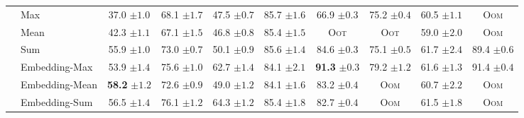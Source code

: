 \begin{table}
{\begin{tabular}{@{}c <{\enspace}@{}lcccccccc@{}}
			\multirow{6}{*}{\rotatebox{90}{$\wlnn$}} 	&
			\textsf{Max}       &  37.0 \scriptsize	$\pm 1.0$ &   68.1  \scriptsize $\pm 1.7$ & 47.5 \scriptsize $\pm 0.7$ &  85.7 \scriptsize $\pm 1.6$ &  66.9 \scriptsize $\pm 0.3$ &    75.2 \scriptsize $\pm 0.4$ & 60.5  \scriptsize $\pm 1.1$ &\textsc{Oom} 
			\\ 
			                                                         & \textsf{Mean}               & 42.3   \scriptsize	$\pm 1.1$        & 67.1    \scriptsize $\pm 1.5$           & 46.8  \scriptsize $\pm 0.8$           & 85.4  \scriptsize $\pm 1.5$          & \textsc{Oot}                        & \textsc{Oot}                         & 59.0 \scriptsize $\pm 2.0$          & \textsc{Oom}          
			\\ 	
			                                                         & \textsf{Sum}     & 55.9  \scriptsize	$\pm 1.0$         & 73.0     \scriptsize $\pm 0.7$          & 50.1 \scriptsize $\pm 0.9$            & 85.6  \scriptsize $\pm 1.4$          & 84.6  \scriptsize $\pm 0.3$         & 75.1 \scriptsize $\pm 0.5$           & 61.7 \scriptsize $\pm 2.4 $         & 89.4  \scriptsize $\pm 0.6$         
			\\  
			\cmidrule{2-10}  		
			                                                         & \textsf{Embedding-Max} & 53.9  \scriptsize	$\pm 1.4$         & 75.6  \scriptsize $\pm 1.0$             & 62.7 \scriptsize $\pm 1.4$            & 84.1  \scriptsize $\pm 2.1$          & \textbf{91.3} \scriptsize $\pm 0.3$ & 79.2 \scriptsize $\pm 1.2$           & 61.6  \scriptsize $\pm 1.3$         & 91.4 \scriptsize $\pm 0.4$          
			\\ 
			                                                         & \textsf{Embedding-Mean}     & \textbf{58.2} \scriptsize	$\pm 1.2$ & 72.6     \scriptsize $\pm 0.9 $         & 49.0 \scriptsize $\pm 1.2$            & 84.1   \scriptsize $\pm 1.6$         & 83.2  \scriptsize $\pm 0.4$         & \textsc{Oom}                         & 60.7 \scriptsize $\pm 2.2  $        & \textsc{Oom}                        
			\\ 
			                                                         & \textsf{Embedding-Sum} & 56.5 \scriptsize	$\pm 1.4$          & 76.1  \scriptsize $\pm 1.2$             & 64.3 \scriptsize $\pm 1.2$            & 85.4   \scriptsize $\pm 1.8$         & 82.7  \scriptsize $\pm 0.4$         & \textsc{Oom}                         & 61.5   \scriptsize $\pm 1.8$        & \textsc{Oom}                        
			\\ 
						

\end{tabular}}
\end{table}
